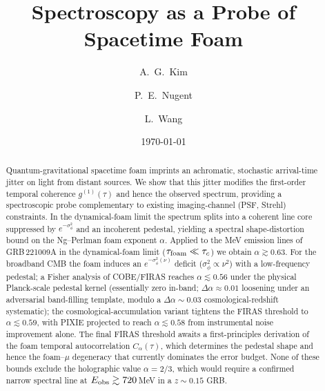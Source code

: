\documentclass[aps,prd,onecolumn,amsmath,amssymb]{revtex4-2}
\begin{document}
\title{Spectroscopy as a Probe of Spacetime Foam}

\author{A.\ G.\ Kim}
\author{P.\ E.\ Nugent}
\author{L.\ Wang}

\date{\today}

\begin{abstract}
Quantum-gravitational spacetime foam imprints an achromatic, stochastic
arrival-time jitter on light from distant sources. We show that this jitter
modifies the first-order temporal coherence $g^{(1)}(\tau)$ and hence the
observed spectrum, providing a spectroscopic probe complementary to existing
imaging-channel (PSF, Strehl) constraints. In the
dynamical-foam limit the spectrum splits into a coherent line core suppressed
by $e^{-\sigma_\phi^2}$ and an incoherent pedestal, yielding a spectral
shape-distortion bound on the Ng--Perlman foam exponent $\alpha$.
Applied to the MeV emission lines of GRB\,221009A in the dynamical-foam
limit ($\tau_{\rm foam}\ll\tau_c$) we obtain $\alpha \gtrsim 0.63$.
For the broadband CMB the foam induces an $e^{-\sigma_\phi^2(\nu)}$ deficit
($\sigma_\phi^2 \propto \nu^2$) with a low-frequency pedestal; a Fisher
analysis of COBE/FIRAS reaches $\alpha \lesssim 0.56$ under the
physical Planck-scale pedestal kernel (essentially zero in-band;
$\Delta\alpha\approx 0.01$ loosening under an adversarial band-filling
template, modulo a $\Delta\alpha\sim 0.03$ cosmological-redshift
systematic); the cosmological-accumulation variant tightens the
FIRAS threshold to $\alpha\lesssim 0.59$, with PIXIE projected to
reach $\alpha\lesssim 0.58$ from instrumental noise improvement alone.  The final FIRAS threshold awaits
a first-principles derivation of the foam temporal autocorrelation
$C_\alpha(\tau)$, which determines the pedestal shape and hence the
foam--$\mu$ degeneracy that currently dominates the error budget. None of these bounds exclude
the holographic value $\alpha = 2/3$, which would require a confirmed
narrow spectral line at $E_{\rm obs} \gtrsim 720$\,MeV in a $z \sim 0.15$ GRB.
\end{abstract}

\maketitle
\end{document}

